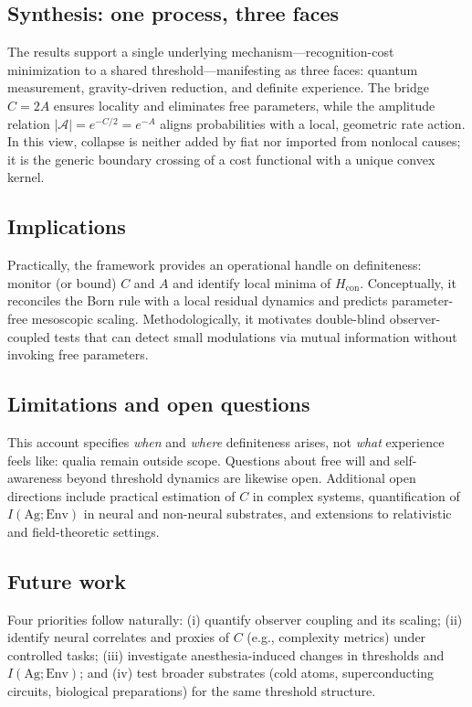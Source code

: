 \documentclass[reprint,aps,prd,nofootinbib]{revtex4-2}
\begin{document}
\subsection{Synthesis: one process, three faces}
The results support a single underlying mechanism---recognition-cost minimization to a shared threshold---manifesting as three faces: quantum measurement, gravity-driven reduction, and definite experience. The bridge $C=2A$ ensures locality and eliminates free parameters, while the amplitude relation $|\mathcal{A}|=e^{-C/2}=e^{-A}$ aligns probabilities with a local, geometric rate action. In this view, collapse is neither added by fiat nor imported from nonlocal causes; it is the generic boundary crossing of a cost functional with a unique convex kernel.

\subsection{Implications}
Practically, the framework provides an operational handle on definiteness: monitor (or bound) $C$ and $A$ and identify local minima of $H_{\mathrm{con}}$. Conceptually, it reconciles the Born rule with a local residual dynamics and predicts parameter-free mesoscopic scaling. Methodologically, it motivates double-blind observer-coupled tests that can detect small modulations via mutual information without invoking free parameters.

\subsection{Limitations and open questions}
This account specifies \emph{when} and \emph{where} definiteness arises, not \emph{what} experience feels like: qualia remain outside scope. Questions about free will and self-awareness beyond threshold dynamics are likewise open. Additional open directions include practical estimation of $C$ in complex systems, quantification of $I(\mathrm{Ag};\mathrm{Env})$ in neural and non-neural substrates, and extensions to relativistic and field-theoretic settings.

\subsection{Future work}
Four priorities follow naturally: (i) quantify observer coupling and its scaling; (ii) identify neural correlates and proxies of $C$ (e.g., complexity metrics) under controlled tasks; (iii) investigate anesthesia-induced changes in thresholds and $I(\mathrm{Ag};\mathrm{Env})$; and (iv) test broader substrates (cold atoms, superconducting circuits, biological preparations) for the same threshold structure.
\end{document}
